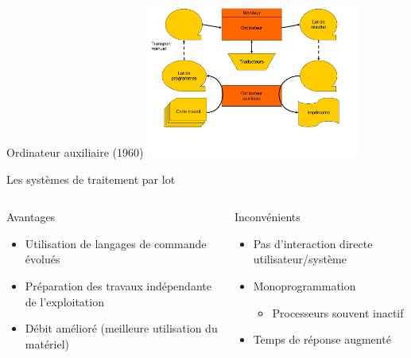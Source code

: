 \begin{frame}{Ordinateur auxiliaire (1960)}
\includegraphics[height=5cm]{../illustration/ordinateur_aux.pdf}
\end{frame}

\begin{frame}{Les systèmes de traitement par lot}
\begin{columns}
\begin{block}{Avantages}
\begin{itemize}
\item Utilisation de langages de commande évolués
\item Préparation des travaux indépendante de l’exploitation
\item Débit amélioré (meilleure utilisation du matériel)
\end{itemize}
\end{block}
\begin{block}{Inconvénients}
\begin{itemize}
\item Pas d'interaction directe utilisateur/système
\item Monoprogrammation
\begin{itemize}
\item Processeurs souvent inactif
\end{itemize}
\item Temps de réponse augmenté
\end{itemize}
\end{block}
\end{columns}
\end{frame}

